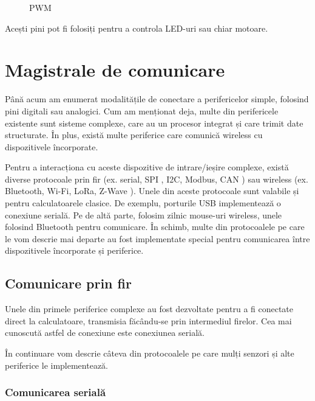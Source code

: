 \begin{figure}[htbp]
	\centering
	\def\svgwidth{\columnwidth}
	
	\caption{PWM}
	\label{fig:embed-pwm}
\end{figure}

Acești pini pot fi folosiți pentru a controla LED-uri sau chiar motoare.

\section{Magistrale de comunicare}
\label{sec:embed-bus}

Până acum am enumerat modalitățile de conectare a perifericelor simple, folosind
pini digitali sau analogici. Cum am menționat deja, multe din perifericele
existente sunt sisteme complexe, care au un procesor integrat și care trimit
date structurate. În plus, există multe periferice care comunică wireless cu
dispozitivele încorporate.

Pentru a interacționa cu aceste dispozitive de intrare/ieșire complexe, există
diverse protocoale prin fir (ex. serial, SPI , I2C, Modbus, CAN ) sau wireless
(ex. Bluetooth, Wi-Fi, LoRa, Z-Wave ). Unele din aceste protocoale sunt valabile
și pentru calculatoarele clasice. De exemplu, porturile USB implementează o
conexiune serială. Pe de altă parte, folosim zilnic mouse-uri wireless, unele
folosind Bluetooth pentru comunicare. În schimb, multe din protocoalele pe care
le vom descrie mai departe au fost implementate special pentru comunicarea între
dispozitivele încorporate și periferice.

\subsection{Comunicare prin fir}
\label{sec:embed-bus-wire}

Unele din primele periferice complexe au fost dezvoltate pentru a fi conectate
direct la calculatoare, transmisia făcându-se prin intermediul firelor. Cea mai
cunoscută astfel de conexiune este conexiunea serială.

În continuare vom descrie câteva din protocoalele pe care mulți senzori și alte
periferice le implementează.

\subsubsection{Comunicarea serială}
\label{sec:embed-bus-wire-serial}

